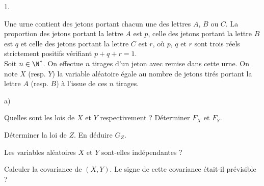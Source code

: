 \begin{exerciceAP}
\begin{noliste}{1.}
  \item Une urne contient des jetons portant chacun une des lettres
    $A$, $B$ ou $C$. La proportion des jetons portant la lettre $A$
    est $p$, celle des jetons portant la lettre $B$ est $q$ et celle
    des jetons portant la lettre $C$ est $r$, où $p$, $q$ et $r$ sont
    trois réels strictement positifs vérifiant $p+q+r=1$.\\
    Soit $n\in\N^*$. On effectue $n$ tirages d'un jeton avec remise
    dans cette urne. On note $X$ (resp. $Y$) la variable aléatoire
    égale au nombre de jetons tirés portant la lettre $A$ (resp. $B$)
    à l'issue de ces $n$ tirages.
    \begin{noliste}{a)}
    \setlength{\itemsep}{2mm}
    \item Quelles sont les lois de $X$ et $Y$ respectivement ?
      Déterminer $F_X$ et $F_Y$.
    \item Déterminer la loi de $Z$. En déduire $G_Z$.
    \item Les variables aléatoires $X$ et $Y$ sont-elles indépendantes
      ?
    \item Calculer la covariance de $(X,Y)$. Le signe de cette
      covariance était-il prévisible ?
    \end{noliste}
  \end{noliste}
\end{exerciceAP} 




